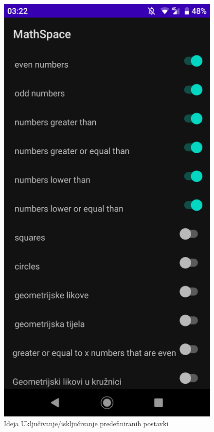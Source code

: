 \documentclass[times, utf8, zavrsni, numeric]{fer}
\begin{document}
		\begin{figure}[H]
			\includegraphics[scale = 0.1]{"slike/defaulttasks.png"} 
			\centering
			\caption{Ideja Uključivanje/isključivanje predefiniranih postavki}
			\label{fig:idejaigre}
		\end{figure}
		
\end{document}
